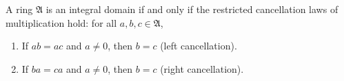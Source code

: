 A ring $\mathfrak{A}$ is an integral domain if and only if the restricted cancellation laws of multiplication hold: for all $a, b, c \in \mathfrak{A}$,
\begin{enumerate}
\item If $ab = ac$ and $a \neq 0$, then $b = c$ (left cancellation).
\item If $ba = ca$ and $a \neq 0$, then $b = c$ (right cancellation).
\end{enumerate}
